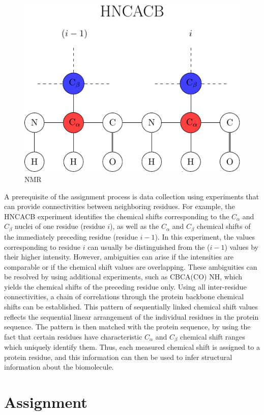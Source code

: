 \documentclass[12pt, letter]{article}
\begin{document}
\begin{figure}[H]
\begin{center}
\includegraphics[width=.6\textwidth]{diagram}
\end{center}
\caption{NMR} %
\label{fig:nmr}
\end{figure}
A prerequisite of the assignment process is data collection using experiments that can provide connectivities between neighboring residues. For example, the HNCACB experiment identifies the chemical shifts corresponding to the $C_\alpha$ and $C_{\beta}$ nuclei of one residue (residue $i$), as well as the $C_\alpha$ and $C_{\beta}$ chemical shifts of the immediately preceding residue (residue $i -1$). In this experiment, the values corresponding to residue $i$ can usually be distinguished from the ($i -1$) values by their higher intensity. However, ambiguities can arise if the intensities are comparable or if the chemical shift values are overlapping. These ambiguities can be resolved by using additional experiments, such as CBCA(CO) NH, which yields the chemical shifts of the preceding residue only. Using all inter-residue connectivities, a chain of correlations through the protein backbone chemical shifts can be established.  This pattern of sequentially linked chemical shift values reflects the sequential linear arrangement of the individual residues in the protein sequence. The pattern is then matched with the protein sequence, by using the fact that certain residues have characteristic $C_\alpha$ and $C_{\beta}$ chemical shift ranges which uniquely identify them. Thus, each measured chemical shift is assigned to a protein residue, and this information can then be used to infer structural information about the biomolecule.

\section{Assignment} %
\label{sec:method}
\end{document}
